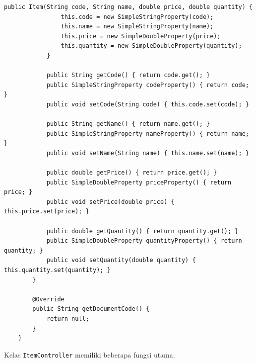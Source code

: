 \begin{lstlisting}[style=JavaStyle]
			public Item(String code, String name, double price, double quantity) {
				this.code = new SimpleStringProperty(code);
				this.name = new SimpleStringProperty(name);
				this.price = new SimpleDoubleProperty(price);
				this.quantity = new SimpleDoubleProperty(quantity);
			}
			
			public String getCode() { return code.get(); }
			public SimpleStringProperty codeProperty() { return code; }
			public void setCode(String code) { this.code.set(code); }
			
			public String getName() { return name.get(); }
			public SimpleStringProperty nameProperty() { return name; }
			public void setName(String name) { this.name.set(name); }
			
			public double getPrice() { return price.get(); }
			public SimpleDoubleProperty priceProperty() { return price; }
			public void setPrice(double price) { this.price.set(price); }
			
			public double getQuantity() { return quantity.get(); }
			public SimpleDoubleProperty quantityProperty() { return quantity; }
			public void setQuantity(double quantity) { this.quantity.set(quantity); }
		}
		
		@Override
		public String getDocumentCode() {
			return null;
		}
	}
\end{lstlisting}

Kelas \texttt{ItemController} memiliki beberapa fungsi utama:

